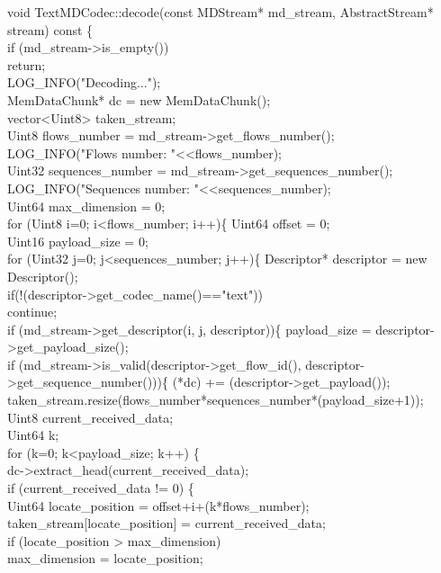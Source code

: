 \begin{code}
void TextMDCodec::decode(const MDStream* md\_stream, AbstractStream* stream) const \{\\
	if (md\_stream->is\_empty()) \\
		return;\\
	LOG\_INFO("Decoding...");\\
	MemDataChunk* dc = new MemDataChunk();\\
	vector<Uint8> taken\_stream;\\
	Uint8 flows\_number = md\_stream->get\_flows\_number();\\
	LOG\_INFO("Flows number: "<<flows\_number);\\
	Uint32 sequences\_number = md\_stream->get\_sequences\_number();\\
	LOG\_INFO("Sequences number: "<<sequences\_number);\\
	Uint64 max\_dimension = 0;\\
	for (Uint8 i=0; i<flows\_number; i++)\{
		Uint64 offset = 0;\\
		Uint16 payload\_size = 0;\\
		for (Uint32 j=0; j<sequences\_number; j++)\{
			Descriptor* descriptor = new Descriptor();\\
			if(!(descriptor->get\_codec\_name()=="text"))\\
			continue;\\
			if (md\_stream->get\_descriptor(i, j, descriptor))\{
				payload\_size = descriptor->get\_payload\_size();\\
				if (md\_stream->is\_valid(descriptor->get\_flow\_id(), descriptor->get\_sequence\_number()))\{
					(*dc) += (descriptor->get\_payload());\\
					taken\_stream.resize(flows\_number*sequences\_number*(payload\_size+1));\\
					Uint8 current\_received\_data;\\
					Uint64 k;\\
					for (k=0; k<payload\_size; k++) \{\\
						dc->extract\_head(current\_received\_data);\\
						if (current\_received\_data != 0) \{\\
							Uint64 locate\_position = offset+i+(k*flows\_number);\\
							taken\_stream[locate\_position] = current\_received\_data;\\
							if (locate\_position > max\_dimension)\\
								max\_dimension = locate\_position;\\

\end{code}
